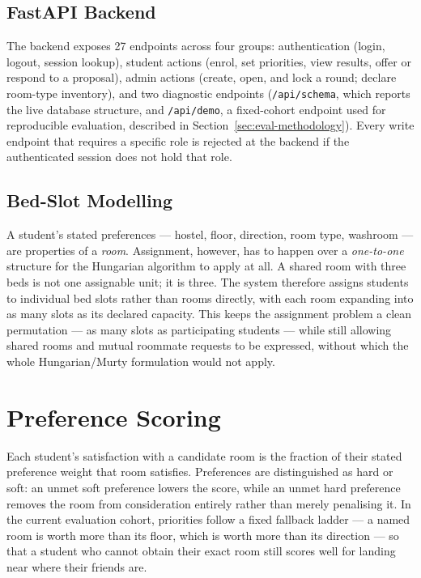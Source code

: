 \documentclass[11pt,a4paper]{report}
\begin{document}
\subsection{FastAPI Backend}

The backend exposes 27 endpoints across four groups: authentication
(login, logout, session lookup), student actions (enrol, set
priorities, view results, offer or respond to a proposal), admin
actions (create, open, and lock a round; declare room-type inventory),
and two diagnostic endpoints (\texttt{/api/schema}, which reports the
live database structure, and \texttt{/api/demo}, a fixed-cohort
endpoint used for reproducible evaluation, described in
Section~\ref{sec:eval-methodology}). Every write endpoint that
requires a specific role is rejected at the backend if the
authenticated session does not hold that role.

\subsection{Bed-Slot Modelling}
\label{sec:bed-slot}

A student's stated preferences --- hostel, floor, direction, room
type, washroom --- are properties of a \emph{room}. Assignment,
however, has to happen over a \emph{one-to-one} structure for the
Hungarian algorithm to apply at all. A shared room with three beds is
not one assignable unit; it is three. The system therefore assigns
students to individual bed slots rather than rooms directly, with each
room expanding into as many slots as its declared capacity. This
keeps the assignment problem a clean permutation --- as many slots as
participating students --- while still allowing shared rooms and
mutual roommate requests to be expressed, without which the whole
Hungarian/Murty formulation would not apply.

\section{Preference Scoring}

Each student's satisfaction with a candidate room is the fraction of
their stated preference weight that room satisfies. Preferences are
distinguished as hard or soft: an unmet soft preference lowers the
score, while an unmet hard preference removes the room from
consideration entirely rather than merely penalising it. In the
current evaluation cohort, priorities follow a fixed fallback ladder
--- a named room is worth more than its floor, which is worth more
than its direction --- so that a student who cannot obtain their exact
room still scores well for landing near where their friends are.
\end{document}
